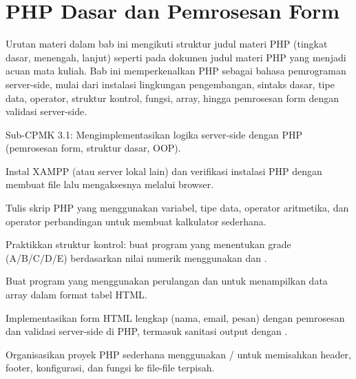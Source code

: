 \documentclass[../main.tex]{subfiles}
\begin{document}
\chapter{PHP Dasar dan Pemrosesan Form}

Urutan materi dalam bab ini mengikuti struktur judul materi PHP (tingkat dasar, menengah, lanjut) seperti pada dokumen judul materi PHP yang menjadi acuan mata kuliah. Bab ini memperkenalkan PHP sebagai bahasa pemrograman server-side, mulai dari instalasi lingkungan pengembangan, sintaks dasar, tipe data, operator, struktur kontrol, fungsi, array, hingga pemrosesan form dengan validasi server-side.

\begin{subcpmk}
  \item Sub-CPMK 3.1: Mengimplementasikan logika server-side dengan PHP (pemrosesan form, struktur dasar, OOP).
\end{subcpmk}

















\begin{aktivitas}
  \item Instal XAMPP (atau server lokal lain) dan verifikasi instalasi PHP dengan membuat file  lalu mengaksesnya melalui browser.
  \item Tulis skrip PHP yang menggunakan variabel, tipe data, operator aritmetika, dan operator perbandingan untuk membuat kalkulator sederhana.
  \item Praktikkan struktur kontrol: buat program yang menentukan grade (A/B/C/D/E) berdasarkan nilai numerik menggunakan  dan .
  \item Buat program yang menggunakan perulangan  dan  untuk menampilkan data array dalam format tabel HTML.
  \item Implementasikan form HTML lengkap (nama, email, pesan) dengan pemrosesan dan validasi server-side di PHP, termasuk sanitasi output dengan .
  \item Organisasikan proyek PHP sederhana menggunakan / untuk memisahkan header, footer, konfigurasi, dan fungsi ke file-file terpisah.
\end{aktivitas}
\end{document}
